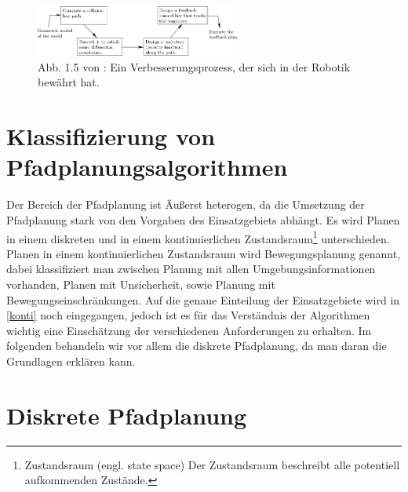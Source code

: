 \begin{figure} %
	\centering
	\includegraphics[width=0.6\textwidth]{images/img247.png}
	\caption{Abb. 1.5 von \cite[~S. 20]{Lav06}:  Ein Verbesserungsprozess, der sich in der Robotik bewährt hat.}
	\label{lav02}
\end{figure}

\section{Klassifizierung von Pfadplanungsalgorithmen} \label{Kapitel 4.2} %
Der Bereich der Pfadplanung ist Äußerst heterogen, da die Umsetzung der Pfadplanung stark von den Vorgaben des Einsatzgebiets abhängt. 
Es wird Planen in einem diskreten und in einem kontinuierlichen Zustandsraum\footnote{Zustandsraum (engl. state space) Der Zustandsraum beschreibt alle potentiell aufkommenden Zustände.} unterschieden. Planen in einem kontinuierlichen Zustandsraum wird Bewegungsplanung genannt, dabei klassifiziert man zwischen Planung mit allen Umgebungsinformationen vorhanden, Planen mit Unsicherheit, sowie Planung mit Bewegungseinschränkungen.
Auf die genaue Einteilung der Einsatzgebiete wird in \ref{konti} noch eingegangen, jedoch ist es für das Verständnis der Algorithmen wichtig eine Einschätzung der verschiedenen Anforderungen zu erhalten. Im folgenden behandeln wir vor allem die diskrete Pfadplanung, da man daran die Grundlagen erklären kann. \cite[~S. 24ff]{Lav06} 

\section{Diskrete Pfadplanung} \label{Kapitel 4.3} %

